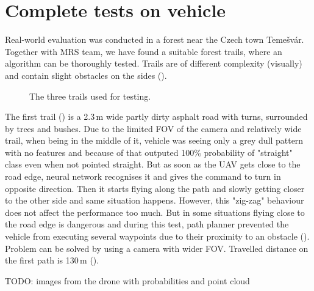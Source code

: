 \section{Complete tests on vehicle}

Real-world evaluation was conducted in a forest near the Czech town Temešvár. Together with \acs{MRS} team, we have found a suitable forest trails, where an algorithm can be thoroughly tested. Trails are of different complexity (visually) and contain slight obstacles on the sides (). 

\begin{figure}[!h]

  \centering

  \centering	
  


  \centering
  \caption{The three trails used for testing.}
  \label{fig:trails}
\end{figure}

The first trail () is a 2.3\,m wide partly dirty asphalt road with turns, surrounded by trees and bushes. Due to the limited \acs{FOV} of the camera and relatively wide trail, when being in the middle of it, vehicle was seeing only a grey dull pattern with no features and because of that outputed 100\% probability of "straight" class even when not pointed straight. But as soon as the \acs{UAV} gets close to the road edge, neural network recognises it and gives the command to turn in opposite direction. Then it starts flying along the path and slowly getting closer to the other side and same situation happens. However, this "zig-zag" behaviour does not affect the performance too much. But in some situations flying close to the road edge is dangerous and during this test, path planner prevented the vehicle from executing several waypoints due to their proximity to an obstacle (). Problem can be solved by using a camera with wider \acs{FOV}. Travelled distance on the first path is 130\,m ().

TODO: images from the drone with probabilities and point cloud

